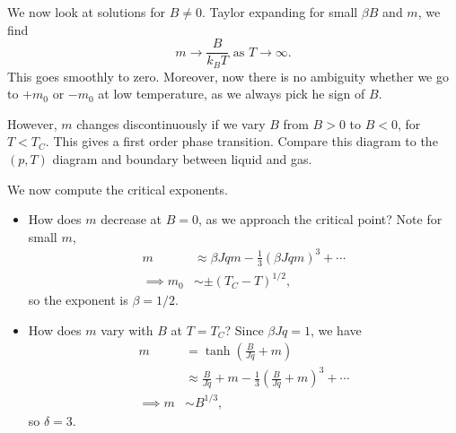 \documentclass[12pt]{article}
\begin{document}
We now look at solutions for $B \neq 0$. Taylor expanding for small $\beta B$ and $m$, we find
\[
	m \to \frac{B}{k_B T}\text{ as } T \to \infty.
\]
This goes smoothly to zero. Moreover, now there is no ambiguity whether we go to $+m_0$ or $-m_0$ at low temperature, as we always pick he sign of $B$.

However, $m$ changes discontinuously if we vary $B$ from $B > 0$ to $B < 0$, for $T < T_C$. This gives a first order phase transition. Compare this diagram to the $(p, T)$ diagram and boundary between liquid and gas.

We now compute the critical exponents.
\begin{itemize}
	\item How does $m$ decrease at $B = 0$, as we approach the critical point? Note for small $m$,
		\begin{align*}
			m &\approx \beta J q m - \frac{1}{3} (\beta J q m)^3 + \cdots \\
			\implies m_0 &\sim \pm (T_C - T)^{1/2},
		\end{align*}
		so the exponent is $\beta = 1/2$.
	\item How does $m$ vary with $B$ at $T = T_C$? Since $\beta J q = 1$, we have
		\begin{align*}
			m &= \tanh \left( \frac{B}{J q} + m\right) \\
			  &\approx \frac{B}{Jq} + m - \frac{1}{3} \left( \frac{B}{Jq} + m \right)^3 + \cdots \\
			\implies m &\sim B^{1/3},
		\end{align*}
		so $\delta = 3$.
\end{itemize}


\newpage

\printindex
\end{document}
